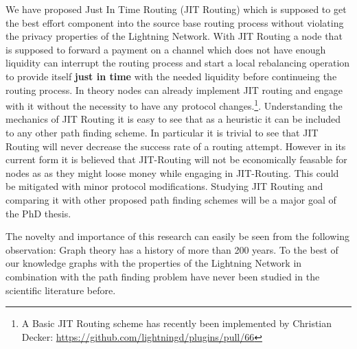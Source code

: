 \documentclass[a4paper]{paper}
\begin{document}
We have proposed Just In Time Routing (JIT Routing) \cite{pickhardt2019jit} which is supposed to get the best effort component into the source base routing process without violating the privacy properties of the Lightning Network.
With JIT Routing a node that is supposed to forward a payment on a channel which does not have enough liquidity can interrupt the routing process and start a local rebalancing operation to provide itself \textbf{just in time} with the needed liquidity before continueing the routing process.
In theory nodes can already implement JIT routing and engage with it without the necessity to have any protocol changes.\footnote{A Basic JIT Routing scheme has recently been implemented by Christian Decker: \url{https://github.com/lightningd/plugins/pull/66}}.
Understanding the mechanics of JIT Routing it is easy to see that as a heuristic it can be included to any other path finding scheme.
In particular it is trivial to see that JIT Routing will never decrease the success rate of a routing attempt.
However in its current form it is believed that JIT-Routing will not be economically feasable for nodes as as they might loose money while engaging in JIT-Routing. This could be mitigated with minor protocol modifications. Studying JIT Routing and comparing it with other proposed path finding schemes will be a major goal of the PhD thesis. 

The novelty and importance of this research can easily be seen from the following observation:
Graph theory has a history of more than 200 years.
To the best of our knowledge graphs with the properties of the Lightning Network in combination with the path finding problem have never been studied in the scientific literature before.
\end{document}
